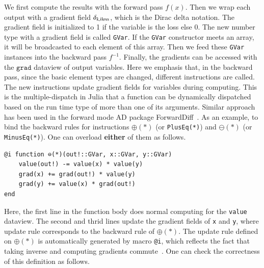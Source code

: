 \documentclass{article}
\newcommand{\<}{\langle}
\renewcommand{\>}{\rangle}
\newcommand{\grad}{{\texttt{grad}}}
\theoremstyle{definition}\newtheorem{definition}{\textit{Definition}}
\begin{document}
We first compute the results with the forward pass $f(x)$.
Then we wrap each output with a gradient field $\delta_{k, \rm iloss}$, which is the Dirac delta notation. The gradient field is initialized to 1 if the variable is the loss else 0. The new number type with a gradient field is called \texttt{GVar}. If the \texttt{GVar} constructor meets an array, it will be broadcasted to each element of this array. Then we feed these \texttt{GVar} instances into the backward pass $f^{-1}$.
Finally, the gradients can be accessed with the $\grad$ dataview of output variables.
Here we emphasis that, in the backward pass, since the basic element types are changed, different instructions are called.
The new instructions update gradient fields for variables during computing.
This is the multiple-dispatch in Julia that a function can be dynamically dispatched based on the run time type of more than one of its arguments.
Similar approach has been used in the forward mode AD package ForwardDiff~\cite{Revels2016}.
As an example, to bind the backward rules for instructions \texttt{$\oplus(*)$} (or \texttt{PlusEq(*)}) and \texttt{$\ominus(*)$} (or \texttt{MinusEq(*)}). One can overload \textbf{either} of them as follows.

\begin{minipage}{.88\columnwidth}
    \begin{lstlisting}[mathescape=true]
@i function ⊖(*)(out!::GVar, x::GVar, y::GVar)
    value(out!) -= value(x) * value(y)
    grad(x) += grad(out!) * value(y)
    grad(y) += value(x) * grad(out!)
end
\end{lstlisting}
\end{minipage}

Here, the first line in the function body does normal computing for the \texttt{value} dataview. The second and thrid lines update the gradient fields of \texttt{x} and \texttt{y}, where update rule corresponds to the backward rule of $\oplus(*)$.
The update rule defined on $\oplus(*)$ is automatically generated by macro \texttt{@i}, which reflects the fact that taking inverse and computing gradients commute~\cite{Mcinerney2015}.
One can check the correctness of this definition as follows.
\end{document}

